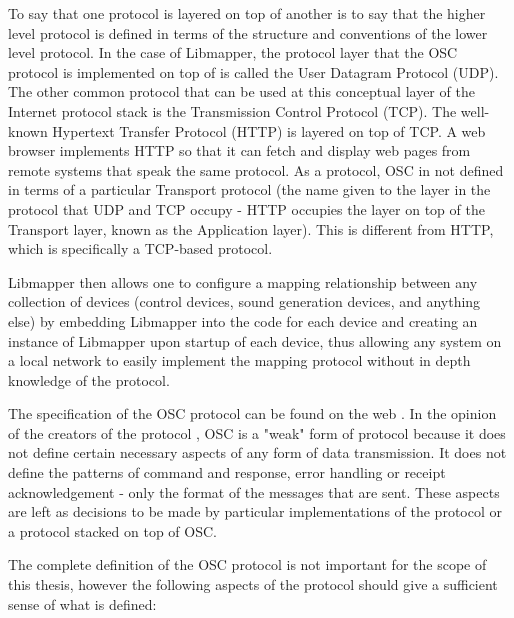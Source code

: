 To say that one protocol is layered on top of another is to say that the higher level protocol is defined in terms of the structure and conventions of the lower level protocol. In the case of Libmapper, the protocol layer that the OSC protocol is implemented on top of is called the User Datagram Protocol (UDP). The other common protocol that can be used at this conceptual layer of the Internet protocol stack is the Transmission Control Protocol (TCP). The well-known Hypertext Transfer Protocol (HTTP) is layered on top of TCP. A web browser implements HTTP so that it can fetch and display web pages from remote systems that speak the same protocol. As a protocol, OSC in not defined in terms of a particular Transport protocol (the name given to the layer in the protocol that UDP and TCP occupy - HTTP occupies the layer on top of the Transport layer, known as the Application layer). This is different from HTTP, which is specifically a TCP-based protocol.

Libmapper then allows one to configure a mapping relationship between any collection of devices (control devices, sound generation devices, and anything else) by embedding Libmapper into the code for each device and creating an instance of Libmapper upon startup of each device, thus allowing any system on a local network to easily implement the mapping protocol without in depth knowledge of the protocol.

The specification of the OSC protocol can be found on the web \cite{osc2011}. In the opinion of the creators of the protocol \cite{osc2009}, OSC is a "weak" form of protocol because it does not define certain necessary aspects of any form of data transmission. It does not define the patterns of command and response, error handling or receipt acknowledgement - only the format of the messages that are sent. These aspects are left as decisions to be made by particular implementations of the protocol or a protocol stacked on top of OSC.

The complete definition of the OSC protocol is not important for the scope of this thesis, however the following aspects of the protocol should give a sufficient sense of what is defined:

